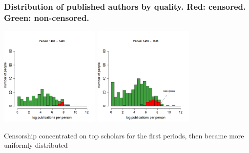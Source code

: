 \documentclass[usepdftitle=false,aspectratio=169,xcolor=dvipsnames]{beamer}
\begin{document}
	\begin{frame}
\frametitle{Distribution of published authors by quality. Red: censored. Green: non-censored. }

\parbox{10cm}{\includegraphics[width=4.95cm,trim=0cm 0cm 0cm 1.5cm, clip]{histo1Q.png}
\includegraphics[width=4.95cm,trim=0cm 0cm 0cm 1.5cm, clip]{histo2Q.png}}\;
\parbox{3.6cm}{\begin{flushleft}Censorship concentrated on top scholars for the first periods, then became more uniformly distributed\end{flushleft}}


\end{frame}
\end{document}
